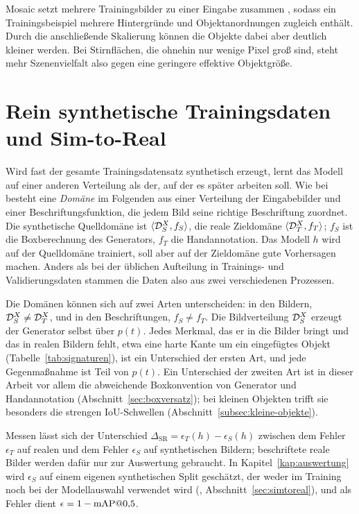 \label{subsec:mosaic} Mosaic setzt
mehrere Trainingsbilder zu einer Eingabe zusammen \parencite{bochkovskiy2020},
sodass ein Trainingsbeispiel mehrere Hintergründe und Objektanordnungen zugleich
enthält. Durch die anschließende Skalierung können die Objekte dabei aber
deutlich kleiner werden. Bei Stirnflächen, die ohnehin nur wenige Pixel groß
sind, steht mehr Szenenvielfalt also gegen eine geringere effektive
Objektgröße.


\section{Rein synthetische Trainingsdaten und Sim-to-Real}
\label{sec:sim2real}

Wird fast der gesamte Trainingsdatensatz synthetisch erzeugt, lernt das Modell
auf einer anderen Verteilung als der, auf der es später arbeiten soll. Wie bei
\textcite{bendavid2010} besteht eine \emph{Domäne} im Folgenden aus einer
Verteilung der Eingabebilder und einer Beschriftungsfunktion, die jedem Bild
seine richtige Beschriftung zuordnet. Die synthetische Quelldomäne ist
$\langle \mathcal{D}_{S}^{X}, f_S\rangle$, die reale Zieldomäne
$\langle \mathcal{D}_{T}^{X}, f_T\rangle$; $f_S$ ist die Boxberechnung des Generators,
$f_T$ die Handannotation. Das Modell $h$ wird auf der Quelldomäne trainiert,
soll aber auf der Zieldomäne gute Vorhersagen machen. Anders als bei der
üblichen Aufteilung in Trainings- und Validierungsdaten stammen die Daten also
aus zwei verschiedenen Prozessen.

Die Domänen können sich auf zwei Arten unterscheiden: in den Bildern,
$\mathcal{D}_{S}^{X} \neq \mathcal{D}_{T}^{X}$, und in den Beschriftungen, $f_S \neq f_T$. Die
Bildverteilung $\mathcal{D}_{S}^{X}$ erzeugt der Generator selbst über $p(t)$. Jedes
Merkmal, das er in die Bilder bringt und das in realen Bildern fehlt, etwa eine
harte Kante um ein eingefügtes Objekt (Tabelle~\ref{tab:signaturen}), ist ein
Unterschied der ersten Art, und jede Gegenmaßnahme ist Teil von $p(t)$. Ein
Unterschied der zweiten Art ist in dieser Arbeit vor allem die abweichende
Boxkonvention von Generator und Handannotation
(Abschnitt~\ref{sec:boxversatz}); bei kleinen Objekten trifft sie besonders die
strengen IoU-Schwellen (Abschnitt~\ref{subsec:kleine-objekte}).

 Messen lässt sich der Unterschied
$\Delta_{\mathrm{SR}} = \epsilon_T(h) - \epsilon_S(h)$ zwischen dem Fehler
$\epsilon_T$ auf realen und dem Fehler $\epsilon_S$ auf synthetischen Bildern;
beschriftete reale Bilder werden dafür nur zur Auswertung gebraucht. In
Kapitel~\ref{kap:auswertung} wird $\epsilon_S$ auf einem eigenen synthetischen
Split geschätzt, der weder im Training noch bei der Modellauswahl verwendet
wird (, Abschnitt~\ref{sec:simtoreal}), und als Fehler dient
$\epsilon = 1 - \text{mAP@0{,}5}$.

